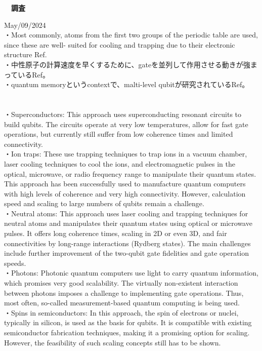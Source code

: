 \documentclass[a4paper,10.5pt]{ltjsarticle}
\begin{document}
\centerline
{\huge \bfseries　調査}
\rightline
{May/09/2024}
\leftline
{}
\\
・Most commonly, atoms from the first two groups of the periodic table are used, since these are well- suited for cooling and trapping due to their electronic structure Ref\cite{1}.\\
・中性原子の計算速度を早くするために、gateを並列して作用させる動きが強まっているRef\cite{1}。\\
・quantum memoryというcontextで、malti-level qubitが研究されているRef\cite{2}。\\
\\
\\
・Superconductors: This approach uses superconducting resonant circuits to build qubits. The circuits operate at very low temperatures, allow for fast gate operations, but currently still suffer from low coherence times and limited connectivity.\\
・Ion traps: These use trapping techniques to trap ions in a vacuum chamber, laser cooling techniques to cool the ions, and electromagnetic pulses in the optical, microwave, or radio frequency range to manipulate their quantum states. This approach has been successfully used to manufacture quantum computers with high levels of coherence and very high connectivity. However, calculation speed and scaling to large numbers of qubits remain a challenge.\\
・Neutral atoms: This approach uses laser cooling and trapping techniques for neutral atoms and manipulates their quantum states using optical or microwave pulses. It offers long coherence times, scaling in 2D or even 3D, and fair connectivities by long-range interactions (Rydberg states). The main challenges include further improvement of the two-qubit gate fidelities and gate operation speeds.\\
・Photons: Photonic quantum computers use light to carry quantum information, which promises very good scalability. The virtually non-existent interaction between photons imposes a challenge to implementing gate operations. Thus, most often, so-called measurement-based quantum computing is being used.\\
・Spins in semiconductors: In this approach, the spin of electrons or nuclei, typically in silicon, is used as the basis for qubits. It is compatible with existing semiconductor fabrication techniques, making it a promising option for scaling. However, the feasibility of such scaling concepts still has to be shown.\\
\end{document}
